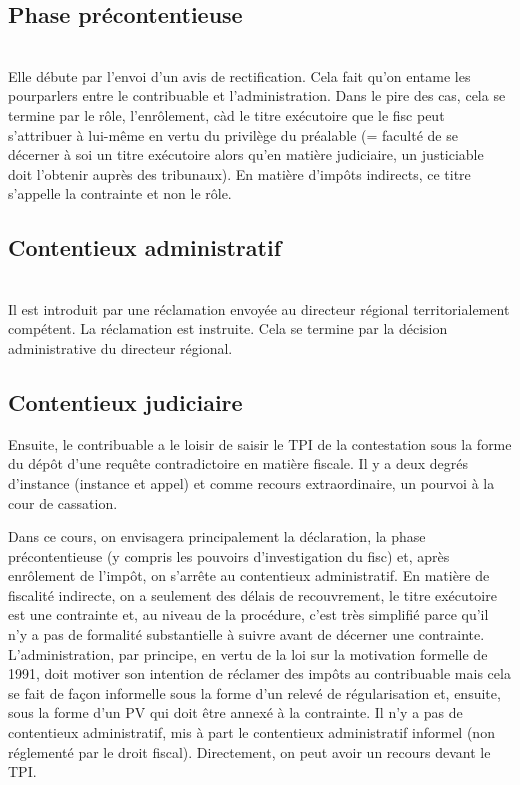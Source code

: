 \documentclass{book}
\begin{document}
\subsection*{Phase précontentieuse}\\
Elle débute par l’envoi d’un avis de rectification. Cela fait qu’on entame les pourparlers entre le contribuable et l’administration. Dans le pire des cas, cela se termine par le rôle, l’enrôlement, càd le titre exécutoire que le fisc peut s’attribuer à lui-même en vertu du privilège du préalable (= faculté de se décerner à soi un titre exécutoire alors qu’en matière judiciaire, un justiciable doit l’obtenir auprès des tribunaux). 
En matière d’impôts indirects, ce titre s’appelle la contrainte et non le rôle.  

\subsection*{Contentieux administratif}\\
Il est introduit par une réclamation envoyée au directeur régional territorialement compétent.
La réclamation est instruite. 
Cela se termine par la décision administrative du directeur régional. 

\subsection*{Contentieux judiciaire}

Ensuite, le contribuable a le loisir de saisir le TPI de la contestation sous la forme du dépôt d’une requête contradictoire en matière fiscale. Il y a deux degrés d’instance (instance et appel) et comme recours extraordinaire, un pourvoi à la cour de cassation.
 
Dans ce cours, on envisagera principalement la déclaration, la phase précontentieuse (y compris les pouvoirs d’investigation du fisc) et, après enrôlement de l’impôt, on s’arrête au contentieux administratif. 
En matière de fiscalité indirecte, on a seulement des délais de recouvrement, le titre exécutoire est une contrainte et, au niveau de la procédure, c’est très simplifié parce qu’il n’y a pas de formalité substantielle à suivre avant de décerner une contrainte. L’administration, par principe, en vertu de la loi sur la motivation formelle de 1991, doit motiver son intention de réclamer des impôts au contribuable mais cela se fait de façon informelle sous la forme d’un relevé de régularisation et, ensuite, sous la forme d’un PV qui doit être annexé à la contrainte. Il n’y a pas de contentieux administratif, mis à part le contentieux administratif informel (non réglementé par le droit fiscal). Directement, on peut avoir un recours devant le TPI. 
\end{document}

